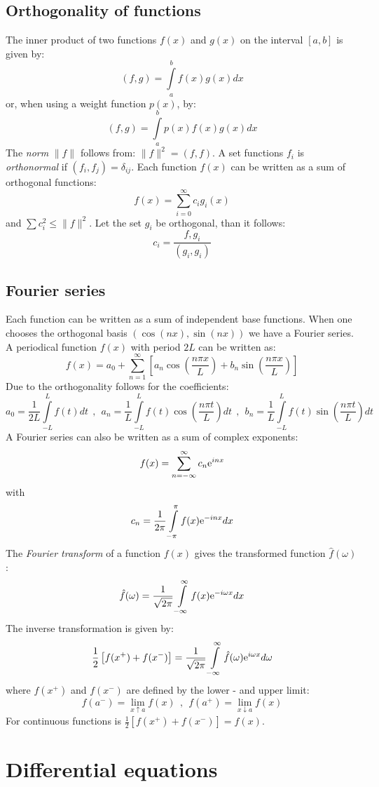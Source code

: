 \section{Orthogonality of functions}
The inner product of two functions $f(x)$ and $g(x)$ on the interval $[a,b]$
is given by:
\[
(f,g)=\int\limits_a^bf(x)g(x)dx
\]
or, when using a weight function $p(x)$, by:
\[
(f,g)=\int\limits_a^bp(x)f(x)g(x)dx
\]
The {\it norm} $\|f\|$ follows from: $\|f\|^2=(f,f)$. A set functions $f_i$
is {\it orthonormal} if $(f_i,f_j)=\delta_{ij}$.
\npar
Each function $f(x)$ can be written as a sum of orthogonal functions:
\[
f(x)=\sum_{i=0}^\infty c_ig_i(x)
\]
and $\sum c_i^2\leq\|f\|^2$. Let the set $g_i$ be orthogonal, than it follows:
\[
c_i=\frac{f,g_i}{(g_i,g_i)}
\]

\section{Fourier series}
Each function can be written as a sum of independent base functions. When one
chooses the orthogonal basis $(\cos(nx),\sin(nx))$ we have a Fourier series.
\npar
A periodical function $f(x)$ with period $2L$ can be written as:
\[
f(x)=a_0+\sum_{n=1}^\infty\left[a_n\cos\left(\frac{n\pi x}{L}\right)+b_n\sin\left(\frac{n\pi x}{L}\right)\right]
\]
Due to the orthogonality follows for the coefficients:
\[
a_0=\frac{1}{2L}\int\limits_{-L}^Lf(t)dt~~,~~
a_n=\frac{1}{L}\int\limits_{-L}^Lf(t)\cos\left(\frac{n\pi t}{L}\right)dt~~,~~
b_n=\frac{1}{L}\int\limits_{-L}^Lf(t)\sin\left(\frac{n\pi t}{L}\right)dt
\]
A Fourier series can also be written as a sum of complex exponents:
\[
f(x)=\sum_{n=-\infty}^\infty c_n{\rm e}^{inx}
\]
with
\[
c_n=\frac{1}{2\pi}\int\limits_{-\pi}^\pi f(x){\rm e}^{-inx}dx
\]
The {\it Fourier transform} of a function $f(x)$ gives the transformed function
$\hat{f}(\omega)$:
\[
\hat{f}(\omega)=\frac{1}{\sqrt{2\pi}}\int\limits_{-\infty}^\infty f(x){\rm e}^{-i\omega x}dx
\]
The inverse transformation is given by:
\[
\frac{1}{2}\left[f(x^+)+f(x^-)\right]=\frac{1}{\sqrt{2\pi}}\int\limits_{-\infty}^\infty\hat{f}(\omega){\rm e}^{i\omega x}d\omega
\]
where $f(x^+)$ and $f(x^-)$ are defined by the lower - and upper limit:
\[
f(a^-)=\lim_{x\uparrow a}f(x)~~,~~f(a^+)=\lim_{x\downarrow a}f(x)
\]
For continuous functions is $\frac{1}{2}\left[f(x^+)+f(x^-)\right]=f(x)$.

\chapter{Differential equations}

